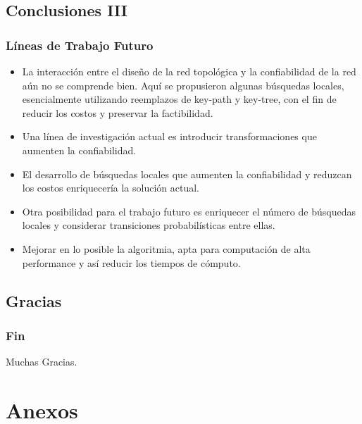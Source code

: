 \subsection{Conclusiones III}
\begin{frame} \frametitle{Líneas de Trabajo Futuro}
\begin{block} {}
   	\begin{scriptsize}
 	 \begin{itemize}
 	 	\item La interacción entre el diseño de la red topológica y la confiabilidad de la red aún no se comprende bien. Aquí se propusieron algunas búsquedas locales, esencialmente utilizando reemplazos de key-path y key-tree, con el fin de reducir los costos y preservar la factibilidad.
 	 	\item Una línea de investigación actual es introducir transformaciones que aumenten la confiabilidad. 
 	 	\item El desarrollo de búsquedas locales que aumenten la confiabilidad y reduzcan los costos enriquecería la solución actual.
 	 	\item Otra posibilidad para el trabajo futuro es enriquecer el número de búsquedas locales y considerar transiciones probabilísticas entre ellas.
 	 	\item Mejorar en lo posible la algoritmia, apta para computación de alta performance y así reducir los tiempos de cómputo.
 	 \end{itemize}  
 	\end{scriptsize}
 \end{block} 	   
\end{frame}

\subsection{Gracias}
\begin{frame} \frametitle{Fin}
\begin{huge}
\begin{center}Muchas Gracias.\end{center}
\end{huge}
\end{frame}

\section{Anexos}

